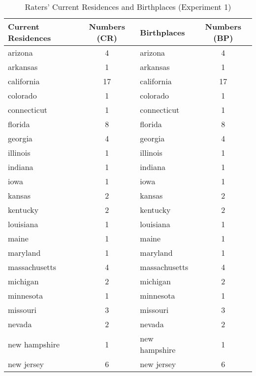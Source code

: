\begin{longtable}{lclc}
  \caption{Raters' Current Residences and Birthplaces (Experiment 1)}\\
\hline
Current Residences & Numbers (CR) & Birthplaces    & Numbers (BP) \\
\hline
arizona           & 4            & arizona        & 4            \\
arkansas          & 1            & arkansas       & 1            \\
california        & 17           & california     & 17           \\
colorado          & 1            & colorado       & 1            \\
connecticut       & 1            & connecticut    & 1            \\
florida           & 8            & florida        & 8            \\
georgia           & 4            & georgia        & 4            \\
illinois          & 1            & illinois       & 1            \\
indiana           & 1            & indiana        & 1            \\
iowa              & 1            & iowa           & 1            \\
kansas            & 2            & kansas         & 2            \\
kentucky          & 2            & kentucky       & 2            \\
louisiana         & 1            & louisiana      & 1            \\
maine             & 1            & maine          & 1            \\
maryland          & 1            & maryland       & 1            \\
massachusetts     & 4            & massachusetts  & 4            \\
michigan          & 2            & michigan       & 2            \\
minnesota         & 1            & minnesota      & 1            \\
missouri          & 3            & missouri       & 3            \\
nevada            & 2            & nevada         & 2            \\
new hampshire     & 1            & new hampshire  & 1            \\
new jersey        & 6            & new jersey     & 6            \\

\end{longtable}

